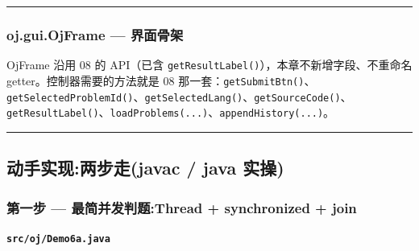\documentclass[
  11pt,
]{ctexart}
\begin{document}
\begin{center}\rule{0.5\linewidth}{0.5pt}\end{center}

\hypertarget{oj.gui.ojframe-ux754cux9762ux9aa8ux67b6}{%
\subsubsection{oj.gui.OjFrame ---
界面骨架}\label{oj.gui.ojframe-ux754cux9762ux9aa8ux67b6}}

OjFrame 沿用 08 的 API（已含
\texttt{getResultLabel()}），本章不新增字段、不重命名
getter。控制器需要的方法就是 08
那一套：\texttt{getSubmitBtn()}、\texttt{getSelectedProblemId()}、\texttt{getSelectedLang()}、\texttt{getSourceCode()}、\texttt{getResultLabel()}、\texttt{loadProblems(...)}、\texttt{appendHistory(...)}。

\begin{center}\rule{0.5\linewidth}{0.5pt}\end{center}

\hypertarget{ux52a8ux624bux5b9eux73b0ux4e24ux6b65ux8d70javac-java-ux5b9eux64cd-6}{%
\subsection{动手实现:两步走(javac / java
实操)}\label{ux52a8ux624bux5b9eux73b0ux4e24ux6b65ux8d70javac-java-ux5b9eux64cd-6}}

\hypertarget{ux7b2cux4e00ux6b65-ux6700ux7b80ux5e76ux53d1ux5224ux9898thread-synchronized-join}{%
\subsubsection{\texorpdfstring{第一步 \KS --- 最简并发判题:Thread +
synchronized +
join}{第一步 --- 最简并发判题:Thread + synchronized + join}}\label{ux7b2cux4e00ux6b65-ux6700ux7b80ux5e76ux53d1ux5224ux9898thread-synchronized-join}}

\textbf{\texttt{src/oj/Demo6a.java}}
\end{document}

